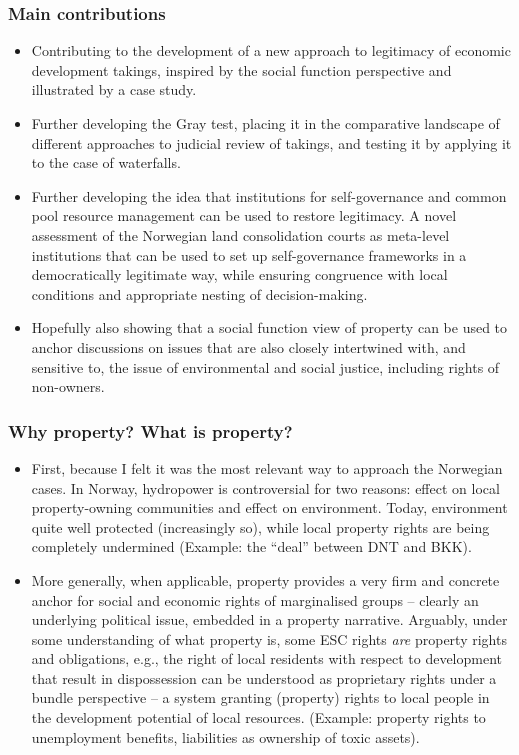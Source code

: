 \documentclass{beamer}
\begin{document}
\begin{frame}
\frametitle{Main contributions}

\begin{itemize}
\item Contributing to the development of a new approach to legitimacy of economic development takings, inspired by the social function perspective and illustrated by a case study.
\item Further developing the Gray test, placing it in the comparative landscape of different approaches to judicial review of takings, and testing it by applying it to the case of waterfalls.
\item Further developing the idea that institutions for self-governance and common pool resource management can be used to restore legitimacy. A novel assessment of the Norwegian land consolidation courts as meta-level institutions that can be used to set up self-governance frameworks in a democratically legitimate way, while ensuring congruence with local conditions and appropriate nesting of decision-making.
\item Hopefully also showing that a social function view of property can be used to anchor discussions on issues that are also closely intertwined with, and sensitive to, the issue of environmental and social justice, including rights of non-owners.
\end{itemize}
\end{frame}
\begin{frame}

\frametitle{Why property? What is property?}

\begin{itemize}
\item First, because I felt it was the most relevant way to approach the Norwegian cases. In Norway, hydropower is controversial for two reasons: effect on local property-owning communities and effect on environment. Today, environment quite well protected (increasingly so), while local property rights are being completely undermined (Example: the ``deal'' between DNT and BKK).
\item More generally, when applicable, property provides a very firm and concrete anchor for social and economic rights of marginalised groups -- clearly an underlying political issue, embedded in a property narrative. Arguably, under some understanding of what property is, some ESC rights {\it are} property rights and obligations, e.g., the right of local residents with respect to development that result in dispossession can be understood as proprietary rights under a bundle perspective -- a system granting (property) rights to local people in the development potential of local resources. (Example: property rights to unemployment benefits, liabilities as ownership of toxic assets).
\end{itemize}
\end{frame}
\end{document}
